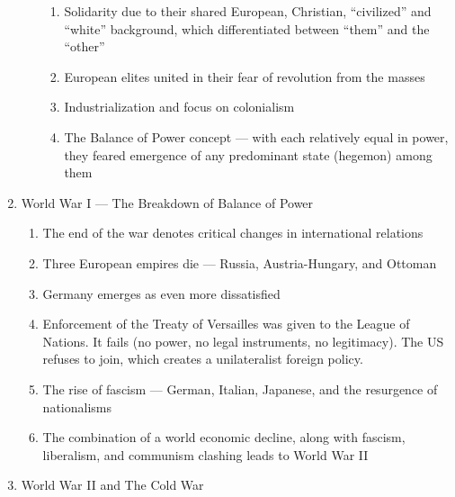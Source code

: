 \documentclass[12pt]{article}
\begin{document}
\begin{enumerate}
\begin{enumerate}
\begin{enumerate}
              \item Solidarity due to their shared European, Christian, “civilized” and “white” background, which differentiated between “them” and the “other”

              \item European elites united in their fear of revolution from the masses

              \item Industrialization and focus on colonialism

              \item The Balance of Power concept — with each relatively equal in power, they feared emergence of any predominant state (hegemon) among them

            \end{enumerate}

        \end{enumerate}

      \item World War I — The Breakdown of Balance of Power

        \begin{enumerate}

          \item The end of the war denotes critical changes in international relations

          \item Three European empires die — Russia, Austria-Hungary, and Ottoman

          \item Germany emerges as even more dissatisfied

          \item Enforcement of the Treaty of Versailles was given to the League of Nations. It fails (no power, no legal instruments, no legitimacy). The US refuses to join, which creates a unilateralist foreign policy.

          \item The rise of fascism — German, Italian, Japanese, and the resurgence of nationalisms

          \item The combination of a world economic decline, along with fascism, liberalism, and communism clashing leads to World War II

        \end{enumerate}

      \item World War II and The Cold War


\end{enumerate}
\end{document}
